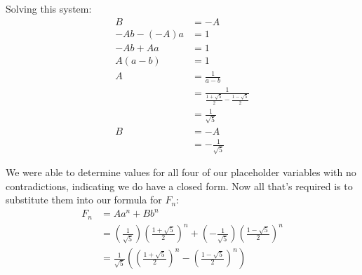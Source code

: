 \documentclass{article}
\begin{document}
Solving this system:
\[\begin{aligned}
    B &= -A \\
    -Ab-(-A)a &= 1 \\
    -Ab+Aa &= 1 \\
    A(a-b) &= 1 \\
    A &= \frac{1}{a-b} \\
    &= \frac{1}{\frac{1 + \sqrt5}{2} - \frac{1 - \sqrt5}{2}} \\
    &= \frac{1}{\sqrt5} \\
    B &= -A \\
    &= -\frac{1}{\sqrt5}
\end{aligned}\]

We were able to determine values for all four of our placeholder variables with
no contradictions, indicating we do have a closed form. Now all that's required
is to substitute them into our formula for \(F_n\):
\[\begin{aligned}
    F_n &= Aa^n + Bb^n \\
    &=\left(\frac{1}{\sqrt5}\right) \left(\frac{1 + \sqrt5}{2}\right)^n
        + \left(-\frac{1}{\sqrt5}\right)\left(\frac{1 - \sqrt5}{2}\right)^n \\
    &= \frac{1}{\sqrt5}\left(\left(\frac{1+\sqrt5}{2}\right)^n
        - \left(\frac{1-\sqrt5}{2}\right)^n\right)
\end{aligned}\]
\end{document}
